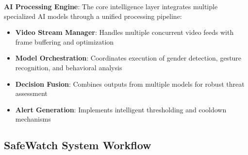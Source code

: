 \documentclass[12pt,a4paper]{article}
\begin{document}
\textbf{AI Processing Engine}:
The core intelligence layer integrates multiple specialized AI models through a unified processing pipeline:

\begin{itemize}
    \item \textbf{Video Stream Manager}: Handles multiple concurrent video feeds with frame buffering and optimization
    \item \textbf{Model Orchestration}: Coordinates execution of gender detection, gesture recognition, and behavioral analysis
    \item \textbf{Decision Fusion}: Combines outputs from multiple models for robust threat assessment
    \item \textbf{Alert Generation}: Implements intelligent thresholding and cooldown mechanisms
\end{itemize}

\subsection{SafeWatch System Workflow}
\end{document}
